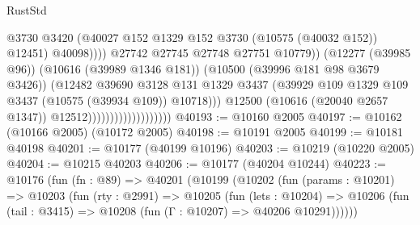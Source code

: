 \begin{lexlean}{RustStd}
\begin{coremodule}
                                                        @3730
                                                        @3420
                                                        (@40027
                                                          @152
                                                          @1329
                                                          @152
                                                          @3730
                                                          (@10575 (@40032 @152))
                                                          @12451)
                                                        @40098))))
                                                @27742
                                                @27745
                                                @27748
                                                @27751
                                                @10779))
                                            (@12277 (@39985 @96))
                                            (@10616 (@39989 @1346 @181))
                                            (@10500 (@39996 @181 @98 @3679 @3426))
                                            (@12482
                                              @39690
                                              @3128
                                              @131
                                              @1329
                                              @3437
                                              (@39929
                                                @109
                                                @1329
                                                @109
                                                @3437
                                                (@10575 (@39934 @109))
                                                @10718)))
                                          @12500
                                          (@10616 (@20040 @2657 @1347))
                                          @12512)))))))))))))))))))
@40193 := @10160 @2005
@40197 := @10162 (@10166 @2005) (@10172 @2005)
@40198 := @10191 @2005
@40199 := @10181 @40198
@40201 := @10177 (@40199 @10196)
@40203 := @10219 (@10220 @2005)
@40204 := @10215 @40203
@40206 := @10177 (@40204 @10244)
@40223 := @10176
    (fun (fn : @89) =>
    @40201
      (@10199
        (@10202
          (fun (params : @10201) =>
          @10203
            (fun (rty : @2991) =>
            @10205
              (fun (lets : @10204) =>
              @10206 (fun (tail : @3415) => @10208 (fun (Γ : @10207) => @40206 @10291))))))

\end{coremodule}
\end{lexlean}
